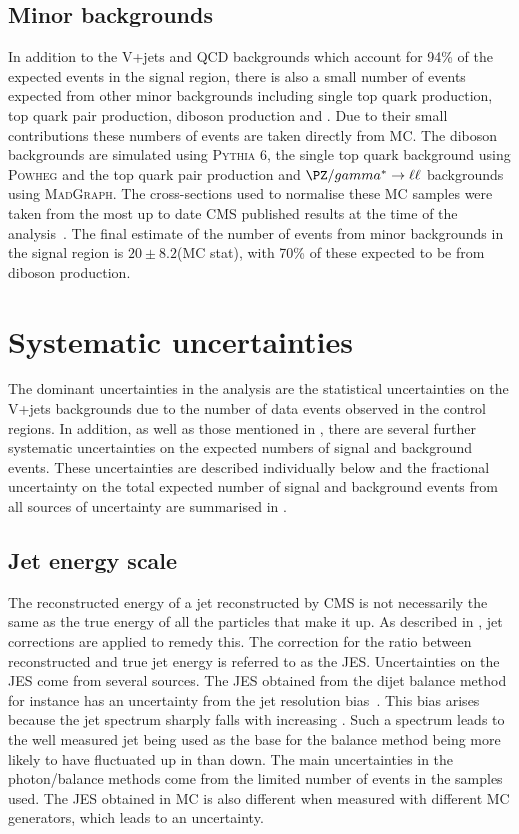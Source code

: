 \subsection{Minor backgrounds}
\label{sec:promptminor}
In addition to the V+jets and QCD backgrounds which account for 94\% of the expected events in the signal region, there is also a small number of events expected from other minor backgrounds including single top quark production, top quark pair production, diboson production and \Zmumu. Due to their small contributions these numbers of events are taken directly from \ac{MC}. The diboson backgrounds are simulated using \textsc{Pythia 6}, the single top quark background using \textsc{Powheg} and the top quark pair production and $\PZ/\gamma^{*}\rightarrow\ell\ell$ backgrounds using \textsc{MadGraph}. The cross-sections used to normalise these \ac{MC} samples were taken from the most up to date CMS published results at the time of the analysis~\cite{CMS:2012fza,CMS:2012iza,CMS:2012zva,CMS:2013qea,CMS:2013hea}. The final estimate of the number of events from minor backgrounds in the signal region is $20\pm 8.2$(MC stat), with 70\% of these expected to be from diboson production.


\section{Systematic uncertainties}
\label{sec:promptsyst}
The dominant uncertainties in the analysis are the statistical uncertainties on the V+jets backgrounds due to the number of data events observed in the control regions. In addition, as well as those mentioned in , there are several further systematic uncertainties on the expected numbers of signal and background events. These uncertainties are described individually below and the fractional uncertainty on the total expected number of signal and background events from all sources of uncertainty are summarised in .
\subsection{Jet energy scale}
\label{sec:promptjes}
The reconstructed energy of a jet reconstructed by CMS is not necessarily the same as the true energy of all the particles that make it up. As described in , jet corrections are applied to remedy this. The correction for the ratio between reconstructed and true jet energy is referred to as the \ac{JES}. Uncertainties on the \ac{JES} come from several sources. The \ac{JES} obtained from the dijet \pt balance method for instance has an uncertainty from the jet resolution bias~\cite{CMS-JME-10-011}. This bias arises because the jet \pt spectrum sharply falls with increasing \pt. Such a spectrum leads to the well measured jet being used as the base for the balance method being more likely to have fluctuated up in \pt than down. The main uncertainties in the photon/\PZ balance methods come from the limited number of events in the samples used. The \ac{JES} obtained in \ac{MC} is also different when measured with different \ac{MC} generators, which leads to an uncertainty.

